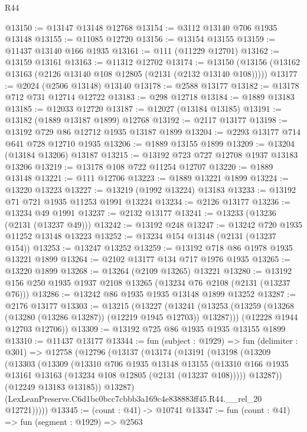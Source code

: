 \begin{lexlean}{R44}
\begin{coremodule}
@13150 := @13147 @13148 @12768
@13154 := @3112 @13140 @706 @1935 @13148
@13155 := @11085 @12720
@13156 := @13154 @13155
@13159 := @11437 @13140 @166 @1935
@13161 := @111 (@11229 @12701)
@13162 := @13159 @13161
@13163 := @11312 @12702
@13174 := @13150 (@13156 (@13162 @13163 (@2126 @13140 @108 @12805 (@2131 (@2132 @13140 @108)))))
@13177 := @2024 (@2506 @13148) @13140
@13178 := @2588 @13177
@13182 := @13178 @712 @731 @12714 @12722
@13183 := @298 @12718
@13184 := @1889 @13183
@13185 := @12033 @12720
@13187 := @12027 (@13184 @13185)
@13191 := @13182 (@1889 @13187 @1899) @12768
@13192 := @2117 @13177
@13198 := @13192 @729 @86 @12712 @1935 @13187 @1899
@13204 := @2293 @13177 @714 @641 @728 @12710 @1935
@13206 := @1889 @13155 @1899
@13209 := @13204 (@13184 @13206) @13187
@13215 := @13192 @723 @727 @12708 @1937 @13183 @13206
@13219 := @13178 @108 @722 @11254 @12707
@13220 := @1889 @13148
@13221 := @111 @12706
@13223 := @1889 @13221 @1899
@13224 := @13220 @13223
@13227 := @13219 (@1992 @13224) @13183
@13233 := @13192 @71 @721 @1935 @11253 @1991 @13224
@13234 := @2126 @13177
@13236 := @13234 @49 @1991
@13237 := @2132 @13177
@13241 := @13233 (@13236 (@2131 (@13237 @49)))
@13242 := @13192 @248
@13247 := @13242 @720 @1935 @11252 @13148 @13223
@13252 := @13234 @154 @13148 (@2131 (@13237 @154))
@13253 := @13247 @13252
@13259 := @13192 @718 @86 @1978 @1935 @13221 @1899
@13264 := @2102 @13177 @134 @717 @1976 @1935
@13265 := @13220 @1899
@13268 := @13264 (@2109 @13265) @13221
@13280 := @13192 @156 @250 @1935 @1937 @2108 @13265 (@13234 @76 @2108 (@2131 (@13237 @76)))
@13286 := @13242 @86 @1935 @1935 @13148 @1899 @13252
@13287 := @2176 @13177
@13303 := @13215
    (@13227
      (@13241 (@13253 (@13259 (@13268 (@13280 (@13286 @13287)) (@12219 @1945 @12703)) @13287)))
      (@12228 @1944 @12703 @12706))
@13309 := @13192 @725 @86 @1935 @1935 @13155 @1899
@13310 := @11437 @13177
@13344 := fun (subject : @1929) =>
  fun (delimiter : @301) =>
  @12758
    (@12796
      (@13137
        (@13174
          (@13191
            (@13198
              (@13209
                (@13303
                  (@13309
                    (@13310
                      @706
                      @1935
                      @13148
                      @13155
                      (@13310 @166 @1935 @13161 @13163 (@13234 @108 @12805 (@2131 (@13237 @108)))))
                    @13287))
                (@12249 @13183 @13185))
              @13287)
            (LexLeanPreserve.C6d1bc0bcc7cbbb3a169c4e838883ff45.R44.__rel_20 @12721)))))
@13345 := (count : @41) -> @10741
@13347 := fun (count : @41) => fun (segment : @1929) => @2563

\end{coremodule}
\end{lexlean}
